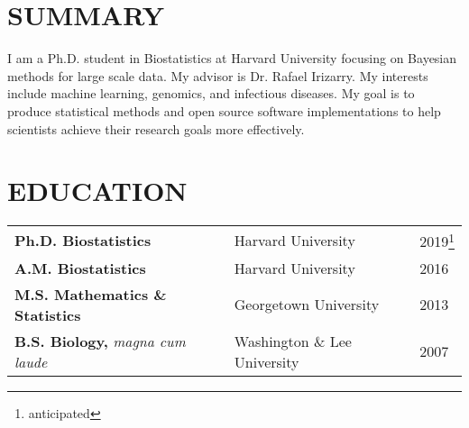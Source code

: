 \documentclass[line, margin]{res}
\begin{document}
\address{\url{ftownes@g.harvard.edu} \hspace{20 pt} \url{http://willtownes.github.io/}}
\begin{resume}
\thispagestyle{plain}

\section{SUMMARY}
I am a Ph.D. student in Biostatistics at Harvard University focusing on Bayesian methods for large scale data. My advisor is Dr. Rafael Irizarry. My interests include machine learning, genomics, and infectious diseases. My goal is to produce statistical methods and open source software implementations to help scientists achieve their research goals more effectively.

\section{EDUCATION}
\begin{savenotes}
\begin{tabular}{l l l}
\textbf{Ph.D. Biostatistics} & Harvard University & 2019\footnote{anticipated}\\
\textbf{A.M. Biostatistics} & Harvard University & 2016\\
\textbf{M.S. Mathematics \& Statistics} & Georgetown University & 2013\\
\textbf{B.S. Biology,} \textit{magna cum laude} & Washington \& Lee University & 2007\\
\end{tabular}

\end{savenotes}


\end{resume}
\end{document}
